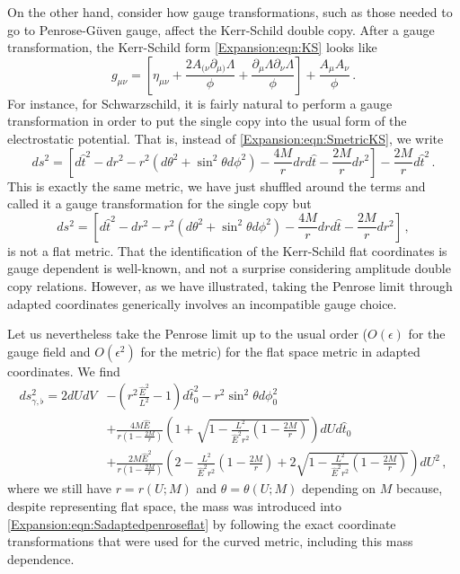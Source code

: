 On the other hand, consider how gauge transformations, such as those needed to go to Penrose-G\"uven gauge, affect the Kerr-Schild double copy. After a gauge transformation, the Kerr-Schild form \eqref{Expansion:eqn:KS} looks like
\begin{equation}\label{Expansion:eqn:KSgauge}
g_{\mu \nu} = \left\lbrack \eta_{\mu \nu} + \frac{2 A_{(\nu} \partial_{\mu)} \Lambda}{\phi} + \frac{\partial_{\mu} \Lambda \partial_{\nu}\Lambda}{\phi} \right\rbrack + \frac{A_{\mu} A_{\nu}}{\phi}  \, .
\end{equation}
For instance, for Schwarzschild, it is fairly natural to perform a gauge transformation in order to put the single copy into the usual form of the electrostatic potential. That is, instead of \eqref{Expansion:eqn:SmetricKS}, we write
\begin{equation}\label{Expansion:eqn:SmetricKSstat}
ds^2 = \left\lbrack d\hat{t}^2- dr^2-r^2 \left(d\theta^2 + \sin^2\theta d \phi^2\right)  -\frac{4M}{r} dr d\hat{t} -\frac{2M}{r}dr^2 \right\rbrack -\frac{2M}{r}d\hat{t}^2  \, .
\end{equation}
This is exactly the same metric, we have just shuffled around the terms and called it a gauge transformation for the single copy but
\begin{equation}\label{Expansion:eqn:SmetricKSstatnotflat}
ds^2 =  \left\lbrack d\hat{t}^2- dr^2-r^2 \left(d\theta^2 + \sin^2\theta d \phi^2\right)  -\frac{4M}{r} dr d\hat{t} -\frac{2M}{r}dr^2 \right\rbrack \, ,
\end{equation}
is not a flat metric. That the identification of the Kerr-Schild flat coordinates is gauge dependent is well-known, and not a surprise considering amplitude double copy relations. However, as we have illustrated, taking the Penrose limit through adapted coordinates generically involves an incompatible gauge choice.

Let us nevertheless take the Penrose limit up to the usual order ($O(\epsilon)$ for the gauge field and $O(\epsilon^2)$ for the metric) for the flat space metric in adapted coordinates. We find
\begin{equation}\label{Expansion:eqn:Sadaptedpenroseflat}
\begin{aligned}
ds^2_{\gamma,\flat} =  
2 dU dV&- \left(r^2 \frac{\hat{E}^2}{L^2}-1\right)d\hat{t}_0^2 - r^2 \sin^2 \theta d \phi_0^2 \\ &+ \frac{4 M \hat{E}}{r\left(1-\frac{2M}{r}\right)}\left(1+\sqrt{1-\frac{L^2}{\hat{E}^2 r^2}\left(1-\frac{2M}{r}\right)}\right)dU d\hat{t}_0 \\ &+ \frac{2M \hat{E}^2}{r\left(1-\frac{2M}{r}\right)}  \left(2-\frac{L^2}{\hat{E}^2 r^2}\left(1-\frac{2M}{r}\right)+2\sqrt{1-\frac{L^2}{\hat{E}^2 r^2}\left(1-\frac{2M}{r}\right)}\right) dU^2 \, ,
\end{aligned}
\end{equation}
where we still have $r = r(U;M)$ and $\theta = \theta(U;M)$ depending on $M$ because, despite representing flat space, the mass was introduced into \eqref{Expansion:eqn:Sadaptedpenroseflat} by following the exact coordinate transformations that were used for the curved metric, including this mass dependence.

